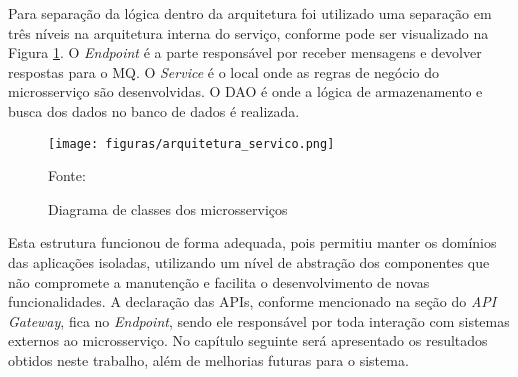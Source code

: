 Para separação da lógica dentro da arquitetura foi utilizado uma separação
em três níveis na arquitetura interna do serviço, conforme pode ser visualizado
na Figura \ref{fig:arch-servico}. O \emph{Endpoint} é a parte responsável
por receber mensagens e devolver respostas para o \ac{MQ}. O \emph{Service}
é o local onde as regras de negócio do microsserviço são desenvolvidas. O
\ac{DAO} é onde a lógica de armazenamento e busca dos dados no banco de
dados é realizada.

\begin{figure}[H]
	\centering
	\caption{Diagrama de classes dos microsserviços}
	\texttt{[image: figuras/arquitetura\_servico.png]}

	\label{fig:arch-servico}
	\footnotesize Fonte: \fonteOAutor
\end{figure}

Esta estrutura funcionou de forma adequada, pois permitiu manter os domínios
das aplicações isoladas, utilizando um nível de abstração dos componentes
que não compromete a manutenção e facilita o desenvolvimento de novas
funcionalidades. A declaração das \acp{API}, conforme mencionado na seção
do \emph{API Gateway}, fica no \emph{Endpoint}, sendo ele responsável
por toda interação com sistemas externos ao microsserviço. No capítulo
seguinte será apresentado os resultados obtidos neste trabalho, além de
melhorias futuras para o sistema.
